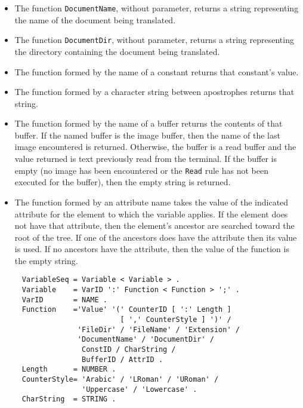 \begin{itemize}
\item
The function {\tt DocumentName}, without parameter, returns a string
representing the name of the document being translated.

\item
The function {\tt DocumentDir}, without parameter, returns a string
representing the directory containing the document being translated.

\item
The function formed by the name of a constant returns that
constant's value.

\item
The function formed by a character string between apostrophes returns
that string.

\item
The function formed by the name of a buffer returns the contents of
that buffer.  If the named buffer is the image buffer, then the name
of the last image encountered is returned.  Otherwise, the buffer is a read buffer
and the value returned is text previously read from the terminal.  If
the buffer is empty (no image has been encountered or the {\tt Read}
rule has not been executed for the buffer), then the empty string is
returned.

\item
The function formed by an attribute name takes the value of the
indicated attribute for the element to which the variable applies.  If
the element does not have that attribute, then the element's ancestor
are searched toward the root of the tree.  If one of the ancestors
does have the attribute then its value is used.  If no ancestors have
the attribute, then the value of the function is the empty string.
\end{itemize}

\begin{verbatim}
     VariableSeq = Variable < Variable > .
     Variable    = VarID ':' Function < Function > ';' .
     VarID       = NAME .
     Function    ='Value' '(' CounterID [ ':' Length ]
                            [ ',' CounterStyle ] ')' /
                  'FileDir' / 'FileName' / 'Extension' /
                  'DocumentName' / 'DocumentDir' /
                   ConstID / CharString / 
                   BufferID / AttrID .
     Length      = NUMBER .
     CounterStyle= 'Arabic' / 'LRoman' / 'URoman' /
                   'Uppercase' / 'Lowercase' .
     CharString  = STRING .
\end{verbatim}

